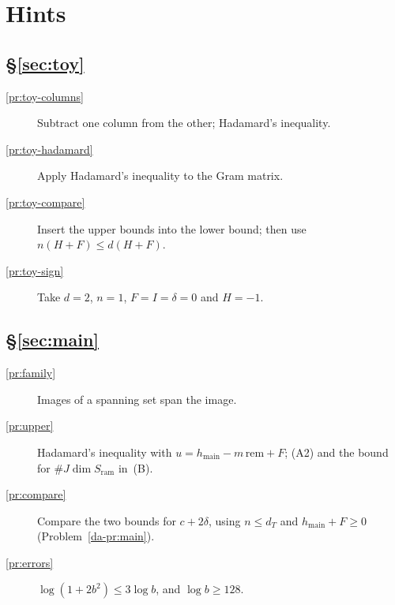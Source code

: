 \documentclass[reqno]{amsart}
\theoremstyle{definition}
\theoremstyle{plain}
\newcommand{\main}{h_{\mathrm{main}}}
\newcommand{\rem}{\mathrm{rem}}
\begin{document}
\section*{Hints}

\subsection*{\S\ref{sec:toy}}
\begin{description}
\item[\ref{pr:toy-columns}] Subtract one column from the other; Hadamard's inequality.
\item[\ref{pr:toy-hadamard}] Apply Hadamard's inequality to the Gram matrix.
\item[\ref{pr:toy-compare}] Insert the upper bounds into the lower bound; then use \(n(H + F) \le d(H + F)\).
\item[\ref{pr:toy-sign}] Take \(d = 2\), \(n = 1\), \(F = I = \delta = 0\) and \(H = -1\).
\end{description}

\subsection*{\S\ref{sec:main}}
\begin{description}
\item[\ref{pr:family}] Images of a spanning set span the image.
\item[\ref{pr:upper}] Hadamard's inequality with \(u = \main - m\,\rem + F\); (A2) and the bound for \(\# J\dim S_{\mathrm{ram}}\) in~(B).
\item[\ref{pr:compare}] Compare the two bounds for \(c + 2\delta\), using \(n \le d_T\) and \(\main + F \ge 0\) (Problem~\ref{da-pr:main}).
\item[\ref{pr:errors}] \(\log(1 + 2b^2) \le 3\log b\), and \(\log b \ge 128\).
\end{description}
\end{document}
